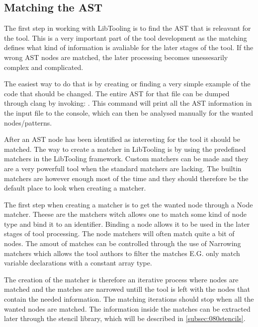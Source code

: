 

\subsection{Matching the AST}

The first step in working with LibTooling is to find the AST that is releavant for the tool. This is a very important part of the tool development as the matching defines what kind of information is avaliable for the later stages of the tool. If the wrong AST nodes are matched, the later processing becomes unessesarily complex and complicated.

The easiest way to do that is by creating or finding a very simple example of the code that should be changed. The entire AST for that file can be dumped through clang by invoking: . 
This command will print all the AST information in the input file to the console, which can then be analysed manually for the wanted nodes/patterns.

After an AST node has been identified as interesting for the tool it should be matched. The way to create a matcher in LibTooling is by using the predefined matchers in the LibTooling framework.\cite{ASTMatcherReference} Custom matchers can be made and they are a very powerfull tool when the standard matchers are lacking. The builtin matchers are however enough most of the time and they should therefore be the default place to look when creating a matcher. 

The first step when creating a matcher is to get the wanted node through a Node matcher. Theese are the matchers witch allows one to match some kind of node type and bind it to an identifier. Binding a node allows it to be used in the later stages of tool processing. The node matchers will often match quite a bit of nodes. The amout of matches can be controlled through the use of Narrowing matchers which allows the tool authors to filter the matches E.G. only match variable declarations with a constant array type.

The creation of the matcher is therefore an iterative process where nodes are matched and the matches are narrowed untill the tool is left with the nodes that contain the needed information. The matching iterations should stop when all the wanted nodes are matched. The information inside the matches can be extracted later through the stencil library, which will be described in \cref{subsec:080stencils}. 

